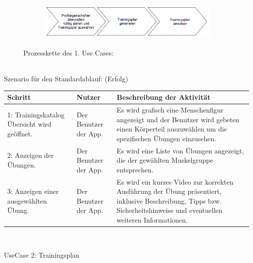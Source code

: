 \documentclass[FIPLY_base.tex]{subfiles}
\begin{document}
	\begin{figure}[H]

		\begin{subfigure}[b]{0.3\textwidth}
			\centering
			\includegraphics[scale=0.65]{img/TrainingsplanGenerierenLassen}
		\end{subfigure}
		\caption{Prozesskette des 1. Use Cases:}
	\end{figure}
		\ \\
	Szenario für den Standardablauf: (Erfolg)
		\ \\
	\begin{center}	
		\def\arraystretch{1.3}%
		\begin{tabular}{| p{3cm} |  p{3cm} |  p{6cm} |}
			\hline
			\textbf{Schritt} & \textbf{Nutzer} & \textbf{Beschreibung der Aktivität}
			\\ \hline 
			1: Trainingskatalog Übersicht wird geöffnet. & Der Benutzer der App. & Es wird grafisch eine Menschenfigur angezeigt und der Benutzer wird gebeten einen Körperteil auszuwählen um die spezifischen Übungen einzusehen.
			\\ \hline
			2: Anzeigen der Übungen. & Der Benutzer der App. & Es wird eine Liste von Übungen angezeigt, die der gewählten Muskelgruppe entsprechen. 
			\\ \hline
			3: Anzeigen einer ausgewählten Übung. & Der Benutzer der App. & Es wird ein kurzes Video zur korrekten Ausführung der Übung präsentiert, inklusive Beschreibung, Tipps bzw. Sicherheitshinweise und eventuellen weiteren Informationen.
			\\ \hline
		\end{tabular} \\
	\end{center}
		\newpage
	UseCase 2: Trainingsplan
		\ \\
\end{document}
